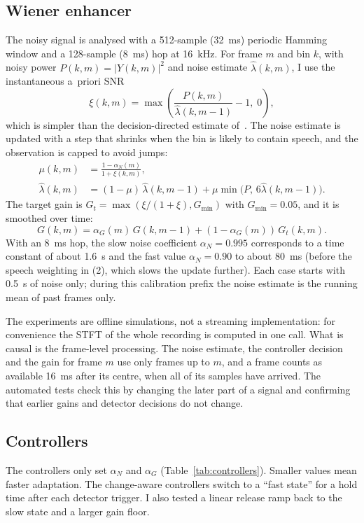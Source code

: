 \documentclass[10pt,conference,a4paper]{IEEEtran}
\begin{document}
\subsection{Wiener enhancer}
The noisy signal is analysed with a 512-sample (32~ms) periodic Hamming window
and a 128-sample (8~ms) hop at 16~kHz. For frame $m$ and bin $k$, with noisy
power $P(k,m)=|Y(k,m)|^2$ and noise estimate $\hat\lambda(k,m)$, I use the
instantaneous a~priori SNR
\begin{equation}
\xi(k,m)=\max\!\left(\frac{P(k,m)}{\hat\lambda(k,m-1)}-1,\;0\right),
\end{equation}
which is simpler than the decision-directed estimate of~\cite{scalart1996apriori}.
The noise estimate is updated with a step that shrinks when the bin is likely
to contain speech, and the observation is capped to avoid jumps:
\begin{align}
\mu(k,m)&=\frac{1-\alpha_N(m)}{1+\xi(k,m)},\\
\hat\lambda(k,m)&=(1-\mu)\,\hat\lambda(k,m-1)+\mu\min\!\big(P,\,6\hat\lambda(k,m-1)\big).
\end{align}
The target gain is $G_t=\max(\xi/(1+\xi),G_{\min})$ with $G_{\min}=0.05$, and it
is smoothed over time:
\begin{equation}
G(k,m)=\alpha_G(m)\,G(k,m-1)+(1-\alpha_G(m))\,G_t(k,m).
\end{equation}
With an 8~ms hop, the slow noise coefficient $\alpha_N=0.995$ corresponds to a
time constant of about 1.6~s and the fast value $\alpha_N=0.90$ to about 80~ms
(before the speech weighting in (2), which slows the update further). Each case
starts with 0.5~s of noise only; during this calibration prefix the noise
estimate is the running mean of past frames only.

The experiments are offline simulations, not a streaming implementation: for
convenience the STFT of the whole recording is computed in one call. What is
causal is the frame-level processing. The noise estimate, the controller
decision and the gain for frame $m$ use only frames up to $m$, and a frame counts
as available 16~ms after its centre, when all of its samples have arrived. The
automated tests check this by changing the later part of a signal and confirming
that earlier gains and detector decisions do not change.

\subsection{Controllers}
The controllers only set $\alpha_N$ and $\alpha_G$ (Table~\ref{tab:controllers}).
Smaller values mean faster adaptation. The change-aware controllers switch to a
``fast state'' for a hold time after each detector trigger. I also tested a
linear release ramp back to the slow state and a larger gain floor.
\end{document}
